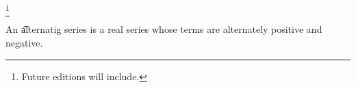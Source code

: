 
\footnote{Future editions will include.}


An \t{alternatig series} is a real series whose terms are alternately positive and negative.


\blankpage
